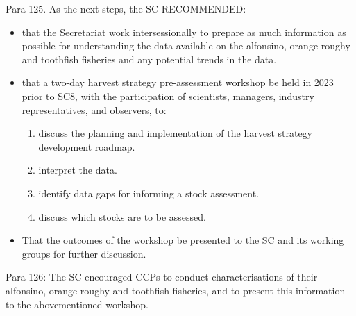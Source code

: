 Para 125. As the next steps, the SC RECOMMENDED:
\begin{itemize}
	\item that the Secretariat work intersessionally to prepare as much information as possible for understanding the data available on the alfonsino, orange roughy and toothfish fisheries and any potential trends in the data.
	\item that a two-day harvest strategy pre-assessment workshop be held in 2023 prior to SC8, with the participation of scientists, managers, industry representatives, and observers, to:
	\begin{enumerate}
		\item discuss the planning and implementation of the harvest strategy development roadmap.
		\item interpret the data.
		\item identify data gaps for informing a stock assessment.
		\item discuss which stocks are to be assessed.
	\end{enumerate}
	\item That the outcomes of the workshop be presented to the SC and its working groups for further discussion.
\end{itemize}

Para 126: The SC encouraged CCPs to conduct characterisations of their alfonsino, orange roughy and toothfish fisheries, and to present this information to the abovementioned workshop.

